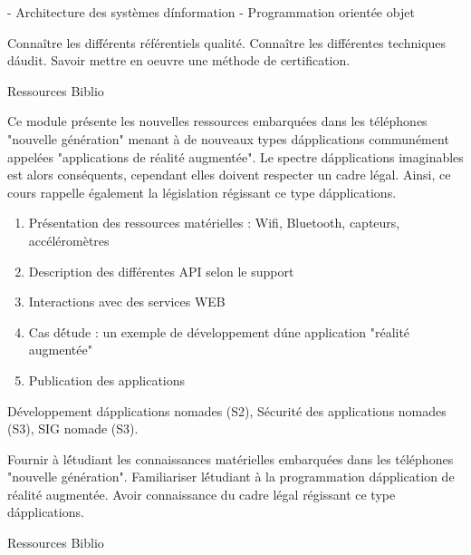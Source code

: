 {- Architecture des systèmes d\'information 
- Programmation orientée objet} 
{\begin{itemize}
\ObjItem Connaître les différents référentiels qualité.
\ObjItem Connaître les différentes techniques d\'audit.
\ObjItem Savoir mettre en oeuvre une méthode de certification.
\end{itemize} 
} 
{Ressources} 
{Biblio} 
 
\vfill


{
Ce module présente les nouvelles ressources embarquées dans les téléphones "nouvelle génération" menant à de nouveaux types d\'applications
communément appelées "applications de réalité augmentée". Le spectre d\'applications imaginables est alors conséquents,
cependant elles doivent respecter un cadre légal. Ainsi, ce cours rappelle également la législation régissant ce type d\'applications.
\begin{enumerate}
\item Présentation des ressources matérielles : Wifi, Bluetooth, capteurs, accéléromètres
\item Description des différentes API selon le support
\item Interactions avec des services WEB
\item Cas d\'étude : un exemple de développement d\'une application "réalité augmentée"
\item Publication des applications 
\end{enumerate}
}
{Développement d\'applications nomades (S2), Sécurité des applications nomades (S3), SIG nomade (S3).} 
{\begin{itemize}
\ObjItem Fournir à l\'étudiant les connaissances matérielles embarquées dans les téléphones "nouvelle génération".
\ObjItem Familiariser l\'étudiant à la programmation d\'application de réalité augmentée. Avoir connaissance du cadre légal régissant ce type d\'applications.
\end{itemize} 
} 
{Ressources} 
{Biblio} 
 
